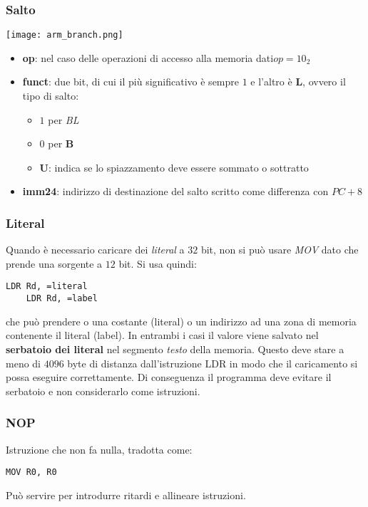 \subsubsection{Salto}
\begin{center}
	\texttt{[image: arm\_branch.png]}
\end{center}
\begin{itemize}
	\item \textbf{op}: nel caso delle operazioni di accesso alla memoria dati$op = 10_2$
	\item \textbf{funct}: due bit, di cui il più significativo è sempre $1$ e l'altro è \textbf{L}, ovvero il tipo di salto:
	\begin{itemize}
		\item $1$ per \textit{BL}
		\item $0$ per \textbf{B}
		\item \textbf{U}: indica se lo spiazzamento deve essere sommato o sottratto
	\end{itemize}
	\item \textbf{imm24}: indirizzo di destinazione del salto scritto come differenza con $PC + 8$ 
\end{itemize}
\subsubsection{Literal}
Quando è necessario caricare dei \textit{literal} a $32$ bit, non si può usare \textit{MOV} dato che prende una sorgente a $12$ bit. Si usa quindi:
\begin{lstlisting}[language={[x86masm]Assembler}]
	LDR Rd, =literal
	LDR Rd, =label
\end{lstlisting}
che può prendere o una costante (literal) o un indirizzo ad una zona di memoria contenente il literal (label). In entrambi i casi il valore viene salvato nel \textbf{serbatoio dei literal} nel segmento \textit{testo} della memoria. Questo deve stare a meno di $4096$ byte di distanza dall'istruzione LDR in modo che il caricamento si possa eseguire correttamente. Di conseguenza il programma deve evitare il serbatoio e non considerarlo come istruzioni.

\subsubsection{NOP}
Istruzione che non fa nulla, tradotta come:
\begin{lstlisting}[language={[x86masm]Assembler}]
	MOV R0, R0
\end{lstlisting}
Può servire per introdurre ritardi e allineare istruzioni.